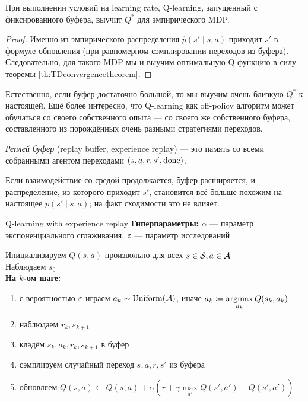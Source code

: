 \begin{proposition}\label{prop:qlearningempiricmdp}
При выполнении условий на learning rate, Q-learning, запущенный с фиксированного буфера, выучит $Q^*$ для эмпирического MDP.
\begin{proof}
Именно из эмпирического распределения $\hat{p}(s' \mid s, a)$ приходит $s'$ в формуле обновления (при равномерном сэмплировании переходов из буфера). Следовательно, для такого MDP мы и выучим оптимальную Q-функцию в силу теоремы \ref{th:TDconvergencetheorem}.
\end{proof}
\end{proposition}

Естественно, если буфер достаточно большой, то мы выучим очень близкую $Q^*$ к настоящей. Ещё более интересно, что Q-learning как off-policy алгоритм может обучаться со своего собственного опыта --- со своего же собственного буфера, составленного из порождённых очень разными стратегиями переходов. 

\begin{definition}
\emph{Реплей буфер} (replay buffer, experience replay) --- это память со всеми собранными агентом переходами $(s, a, r, s', \mathrm{done})$.
\end{definition}

Если взаимодействие со средой продолжается, буфер расширяется, и распределение, из которого приходит $s'$, становится всё больше похожим на настоящее $p(s' \mid s, a)$; на факт сходимости это не влияет.

\begin{algorithm}{Q-learning with experience replay}
\textbf{Гиперпараметры:} $\alpha$ --- параметр экспоненциального сглаживания, $\varepsilon$ --- параметр исследований

\vspace{0.3cm}
Инициализируем $Q(s, a)$ произвольно для всех $s \in \mathcal{S}, a \in \mathcal{A}$ \\
Наблюдаем $s_0$ \\ 
\textbf{На $k$-ом шаге:}
\begin{enumerate}
    \item с вероятностью $\varepsilon$ играем $a_k \sim \operatorname{Uniform}(\mathcal{A})$, иначе $a_k \coloneqq \mathop{\mathrm{argmax}}\limits_{a_k} Q(s_k, a_k)$
    \item наблюдаем $r_k, s_{k+1}$
    \item кладём $s_k, a_k, r_k, s_{k+1}$ в буфер
    \item сэмплируем случайный переход $s, a, r, s'$ из буфера
    \item обновляем $Q(s, a) \leftarrow Q(s, a) + \alpha \left( r + \gamma \max\limits_{a'} Q(s', a') - Q(s', a') \right)$
\end{enumerate}
\end{algorithm}

